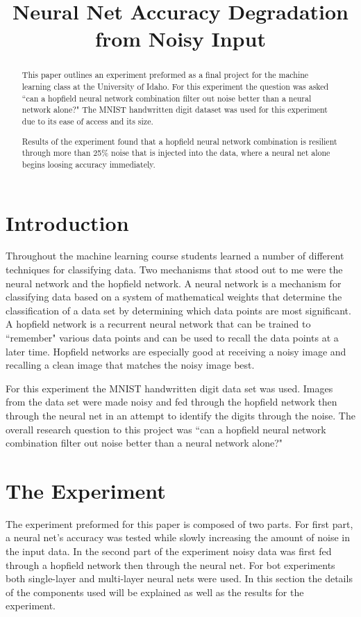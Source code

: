 \documentclass{IEEEtran}
\author{
	\IEEEauthorblockN{MatthewBrown\\}
	\IEEEauthorblockA{Machine Learning Final Project\\University of Idaho}	
}
\title{Neural Net Accuracy Degradation from Noisy Input}
\begin{document}
	\maketitle
	\begin{abstract}
		This paper outlines an experiment preformed as a final project for the machine learning class at the University of Idaho. For this experiment the question was asked ``can a hopfield neural network combination filter out noise better than a neural network alone?" The MNIST handwritten digit dataset was used for this experiment due to its ease of access and its size.
		
		Results of the experiment found that a hopfield neural network combination is resilient through more than 25\% noise that is injected into the data, where a neural net alone begins loosing accuracy immediately.
	\end{abstract}
	
	\section{Introduction}
		Throughout the machine learning course students learned a number of different techniques for classifying data. Two mechanisms that stood out to me were the neural network and the hopfield network. A neural network is a mechanism for classifying data based on a system of mathematical weights that determine the classification of a data set by determining which data points are most significant. A hopfield network is a recurrent neural network that can be trained to ``remember" various data points and can be used to recall the data points at a later time. Hopfield networks are especially good at receiving a noisy image and recalling a clean image that matches the noisy image best.
		
		For this experiment the MNIST handwritten digit data set was used. Images from the data set were made noisy and fed through the hopfield network then through the neural net in an attempt to identify the digits through the noise. The overall research question to this project was ``can a hopfield neural network combination filter out noise better than a neural network alone?"
		
	\section{The Experiment}
		The experiment preformed for this paper is composed of two parts. For first part, a neural net's accuracy was tested while slowly increasing the amount of noise in the input data. In the second part of the experiment noisy data was first fed through a hopfield network then through the neural net. For bot experiments both single-layer and multi-layer neural nets were used. In this section the details of the components used will be explained as well as the results for the experiment.
\end{document}
